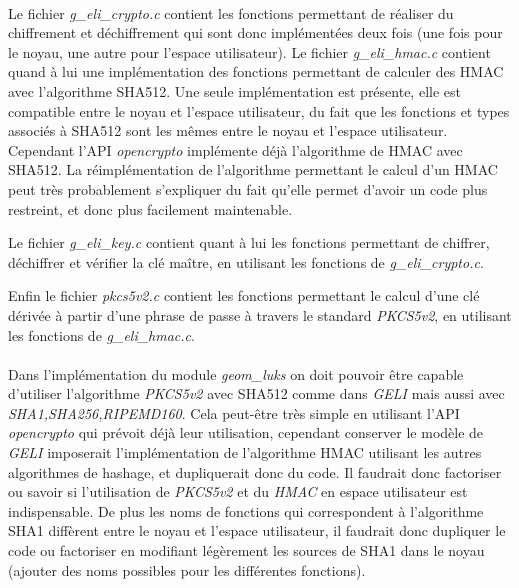 \paragraph{}
Le fichier {\em g\_eli\_crypto.c} contient les fonctions permettant de réaliser
du chiffrement et déchiffrement qui sont donc implémentées deux fois (une fois
pour le noyau, une autre pour l'espace utilisateur). Le fichier
{\em g\_eli\_hmac.c} contient quand à lui une implémentation des fonctions
permettant de calculer des HMAC avec l'algorithme SHA512. Une seule implémentation
est présente, elle est compatible entre le noyau et l'espace utilisateur, du fait
que les fonctions et types associés à SHA512 sont les mêmes entre le noyau et
l'espace utilisateur.
Cependant l'API {\em opencrypto} implémente déjà l'algorithme de HMAC avec SHA512.
La réimplémentation de l'algorithme permettant le calcul d'un HMAC peut très
probablement s'expliquer du fait qu'elle permet d'avoir un code plus restreint,
et donc plus facilement maintenable.

Le fichier {\em g\_eli\_key.c} contient quant à lui les fonctions permettant de
chiffrer, déchiffrer et vérifier la clé maître, en utilisant les fonctions de
{\em g\_eli\_crypto.c}.

Enfin le fichier {\em pkcs5v2.c} contient les fonctions permettant le calcul
d'une clé dérivée à partir d'une phrase de passe à travers le standard
{\em PKCS5v2}, en utilisant les fonctions de {\em g\_eli\_hmac.c}.

\paragraph{}
Dans l'implémentation du module {\em geom\_luks} on doit pouvoir être capable
d'utiliser l'algorithme {\em PKCS5v2} avec SHA512 comme dans {\em GELI} mais
aussi avec {\em SHA1,SHA256,RIPEMD160}. Cela peut-être très simple en utilisant
l'API {\em opencrypto} qui prévoit déjà leur utilisation, cependant conserver
le modèle de {\em GELI} imposerait l'implémentation de l'algorithme HMAC utilisant
les autres algorithmes de hashage, et dupliquerait donc du code. Il faudrait
donc factoriser ou savoir si l'utilisation de {\em PKCS5v2} et du {\em HMAC}
en espace utilisateur est indispensable. De plus les noms de fonctions qui
correspondent à l'algorithme SHA1 diffèrent entre le noyau et l'espace
utilisateur, il faudrait donc dupliquer le code ou factoriser en modifiant
légèrement les sources de SHA1 dans le noyau (ajouter des noms possibles pour
les différentes fonctions).

